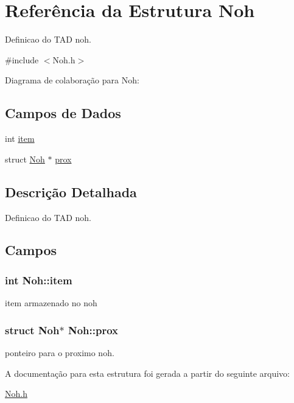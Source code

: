 \hypertarget{structNoh}{\section{Referência da Estrutura Noh}
\label{structNoh}
}


Definicao do T\+A\+D noh.  




{\ttfamily \#include $<$Noh.\+h$>$}



Diagrama de colaboração para Noh\+:
\subsection*{Campos de Dados}
\begin{DoxyCompactItemize}
\item 
int \hyperlink{structNoh_a0691ad86f75d219cd1910f597e00af3b}{item}
\item 
struct \hyperlink{structNoh}{Noh} $\ast$ \hyperlink{structNoh_a58a658d8b31d6238aac34c927bef689d}{prox}
\end{DoxyCompactItemize}


\subsection{Descrição Detalhada}
Definicao do T\+A\+D noh. 

\subsection{Campos}
\hypertarget{structNoh_a0691ad86f75d219cd1910f597e00af3b}{
\subsubsection[{item}]{\setlength{\rightskip}{0pt plus 5cm}int Noh\+::item}}\label{structNoh_a0691ad86f75d219cd1910f597e00af3b}
item armazenado no noh \hypertarget{structNoh_a58a658d8b31d6238aac34c927bef689d}{
\subsubsection[{prox}]{\setlength{\rightskip}{0pt plus 5cm}struct {\bf Noh}$\ast$ Noh\+::prox}}\label{structNoh_a58a658d8b31d6238aac34c927bef689d}
ponteiro para o proximo noh. 

A documentação para esta estrutura foi gerada a partir do seguinte arquivo\+:\begin{DoxyCompactItemize}
\item 
\hyperlink{Noh_8h}{Noh.\+h}\end{DoxyCompactItemize}
